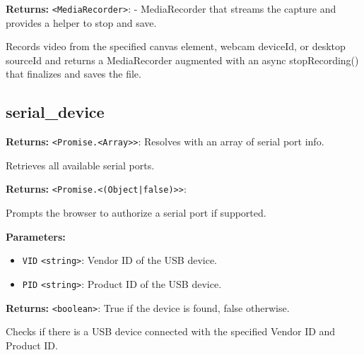 \documentclass[12pt,a4paper]{article}
\begin{document}
\noindent \textbf{Returns:} \texttt{<MediaRecorder>}: - MediaRecorder that streams the capture and provides a helper to stop and save.

\noindent Records video from the specified canvas element, webcam deviceId, or desktop sourceId and returns a MediaRecorder augmented with an async stopRecording() that finalizes and saves the file.


\subsection{serial\_device}
\vspace{5mm}
\noindent {}


\noindent \textbf{Returns:} \texttt{<Promise.<Array>>}: Resolves with an array of serial port info.

\noindent Retrieves all available serial ports.

\vspace{5mm}
\noindent {}


\noindent \textbf{Returns:} \texttt{<Promise.<(Object|false)>>}:

\noindent Prompts the browser to authorize a serial port if supported.

\vspace{5mm}
\noindent {}


\noindent \textbf{Parameters:}
\begin{itemize}
  \item \texttt{VID} \texttt{<string>}: Vendor ID of the USB device.
  \item \texttt{PID} \texttt{<string>}: Product ID of the USB device.
\end{itemize}

\noindent \textbf{Returns:} \texttt{<boolean>}: True if the device is found, false otherwise.

\noindent Checks if there is a USB device connected with the specified Vendor ID and Product ID.

\vspace{5mm}
\noindent {}
\end{document}
